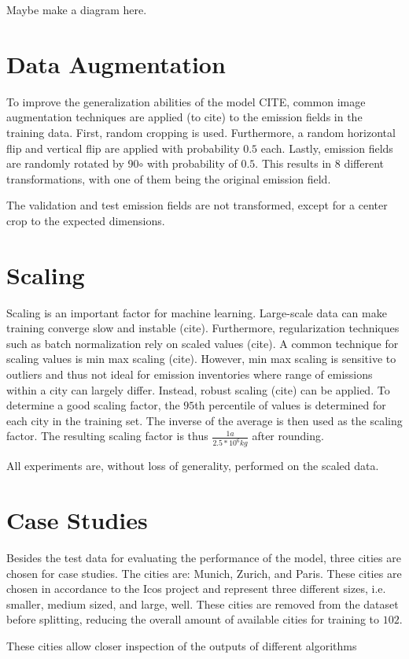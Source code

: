 Maybe make a diagram here.

\section{Data Augmentation}
To improve the generalization abilities of the model CITE, common image augmentation techniques are applied (to cite) to the emission fields in the training data.
First, random cropping is used.
Furthermore, a random horizontal flip and vertical flip are applied with probability $0.5$ each.
Lastly, emission fields are randomly rotated by 90$\circ$ with probability of $0.5$.
This results in $8$ different transformations, with one of them being the original emission field.

The validation and test emission fields are not transformed, except for a center crop to the expected dimensions.

\section{Scaling}
Scaling is an important factor for machine learning.
Large-scale data can make training converge slow and instable (cite).
Furthermore, regularization techniques such as batch normalization \parencite{BatchNorm} rely on scaled values (cite).
A common technique for scaling values is min max scaling (cite).
However, min max scaling is sensitive to outliers and thus not ideal for emission inventories where range of emissions within a city can largely differ.
Instead, robust scaling (cite) can be applied.
To determine a good scaling factor, the $95$th percentile of values is determined for each city in the training set.
The inverse of the average is then used as the scaling factor.
The resulting scaling factor is thus $\frac{1 a}{2.5 * 10^6 kg}$ after rounding.

All experiments are, without loss of generality, performed on the scaled data.

\section{Case Studies}
Besides the test data for evaluating the performance of the model, three cities are chosen for case studies.
The cities are: Munich, Zurich, and Paris.
These cities are chosen in accordance to the Icos project \parencite{Icos} and represent three different sizes, i.e. smaller, medium sized, and large, well.
These cities are removed from the dataset before splitting, reducing the overall amount of available cities for training to $102$.

These cities allow closer inspection of the outputs of different algorithms
